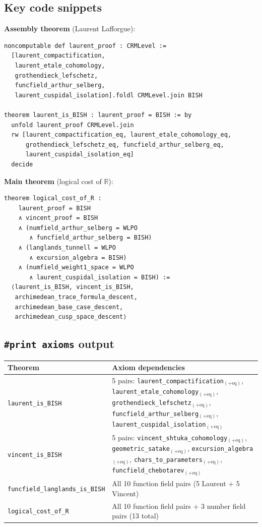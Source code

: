 \documentclass[11pt]{article}
\theoremstyle{plain}
\theoremstyle{definition}
\theoremstyle{remark}
\newcommand{\R}{\mathbb{R}}
\begin{document}
\subsection{Key code snippets}

\textbf{Assembly theorem} (Laurent Lafforgue):
\begin{lstlisting}
noncomputable def laurent_proof : CRMLevel :=
  [laurent_compactification,
   laurent_etale_cohomology,
   grothendieck_lefschetz,
   funcfield_arthur_selberg,
   laurent_cuspidal_isolation].foldl CRMLevel.join BISH

theorem laurent_is_BISH : laurent_proof = BISH := by
  unfold laurent_proof CRMLevel.join
  rw [laurent_compactification_eq, laurent_etale_cohomology_eq,
      grothendieck_lefschetz_eq, funcfield_arthur_selberg_eq,
      laurent_cuspidal_isolation_eq]
  decide
\end{lstlisting}

\textbf{Main theorem} (logical cost of $\R$):
\begin{lstlisting}
theorem logical_cost_of_R :
    laurent_proof = BISH
    ∧ vincent_proof = BISH
    ∧ (numfield_arthur_selberg = WLPO
       ∧ funcfield_arthur_selberg = BISH)
    ∧ (langlands_tunnell = WLPO
       ∧ excursion_algebra = BISH)
    ∧ (numfield_weight1_space = WLPO
       ∧ laurent_cuspidal_isolation = BISH) :=
  ⟨laurent_is_BISH, vincent_is_BISH,
   archimedean_trace_formula_descent,
   archimedean_base_case_descent,
   archimedean_cusp_space_descent⟩
\end{lstlisting}

\subsection{\texttt{\#print axioms} output}

\begin{center}
\small
\begin{tabular}{lp{10cm}}
\toprule
\textbf{Theorem} & \textbf{Axiom dependencies} \\
\midrule
\texttt{laurent\_is\_BISH} &
  5 pairs: \texttt{laurent\_compactification}$_{(+\text{eq})}$,
  \texttt{laurent\_etale\_cohomology}$_{(+\text{eq})}$,
  \texttt{grothendieck\_lefschetz}$_{(+\text{eq})}$,
  \texttt{funcfield\_arthur\_selberg}$_{(+\text{eq})}$,
  \texttt{laurent\_cuspidal\_isolation}$_{(+\text{eq})}$ \\
\addlinespace
\texttt{vincent\_is\_BISH} &
  5 pairs: \texttt{vincent\_shtuka\_cohomology}$_{(+\text{eq})}$,
  \texttt{geometric\_satake}$_{(+\text{eq})}$,
  \texttt{excursion\_algebra}$_{(+\text{eq})}$,
  \texttt{chars\_to\_parameters}$_{(+\text{eq})}$,
  \texttt{funcfield\_chebotarev}$_{(+\text{eq})}$ \\
\addlinespace
\texttt{funcfield\_langlands\_is\_BISH} &
  All 10 function field pairs (5 Laurent + 5 Vincent) \\
\addlinespace
\texttt{logical\_cost\_of\_R} &
  All 10 function field pairs + 3 number field pairs (13 total) \\
\bottomrule
\end{tabular}
\end{center}
\end{document}
